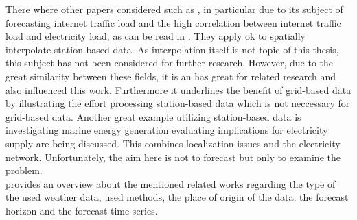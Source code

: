 There where other papers considered such as , in particular due to its subject of forecasting internet traffic load and the high correlation between internet traffic load and electricity load, as can be read in . They apply \gls{ok} to spatially interpolate station-based data. As interpolation itself is not topic of this thesis, this subject has not been considered for further research. However, due to the great similarity between these fields, it is an has great for related research and also influenced this work. Furthermore it underlines the benefit of grid-based data by illustrating the effort processing station-based data which is not neccessary for grid-based data. Another great example utilizing station-based data is  investigating marine energy generation evaluating implications for electricity supply are being discussed. This combines localization issues and the electricity network. Unfortunately, the aim here is not to forecast but only to examine the problem.\\

 provides an overview about the mentioned related works regarding the type of the used weather data, used methods, the place of origin of the data, the forecast horizon and the forecast time series.\\


